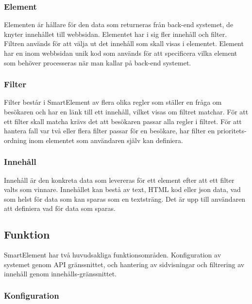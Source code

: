 \subsubsection{Element}

Elementen är hållare för den data som returneras från back-end systemet, de knyter innehållet till webbsidan. Elementet har i sig fler innehåll och filter. Filtren används för att välja ut det innehåll som skall visas i elementet. Element har en inom webbsidan unik kod som används för att specificera vilka element som behöver processeras när man kallar på back-end systemet.

\subsubsection{Filter}

Filter består i SmartElement av flera olika regler som ställer en fråga om besökaren och har en länk till ett innehåll, vilket visas om filtret matchar. För att ett filter skall matcha krävs det att besökaren passar alla regler i filtret. För att hantera fall var två eller flera filter passar för en besökare, har filter en prioritets-ordning inom elementet som användaren själv kan definiera.

\subsubsection{Innehåll}

Innehåll är den konkreta data som levereras för ett element efter att ett filter valts som vinnare. Innehållet kan bestå av text, HTML kod eller \gls{json} data, vad som helst för data som kan sparas som en textsträng. Det är upp till användaren att definiera vad för data som sparas.

\subsection{Funktion}

SmartElement har två huvudsakliga funktionsområden. Konfiguration av systemet genom API gränssnittet, och hantering av sidvisningar och filtrering av innehåll genom innehålls-gränssnittet.

\subsubsection{Konfiguration}


